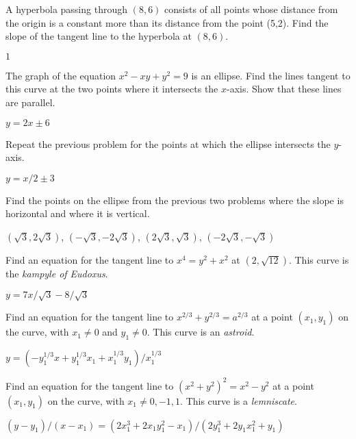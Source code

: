 \begin{exercises}
\begin{exercise}
A hyperbola passing through $(8,6)$ consists of all points whose distance
from the origin is a constant more than its distance from the point (5,2).
Find the slope of the tangent line to the hyperbola at $(8,6)$.
\begin{answer} $1$
\end{answer}\end{exercise}

\begin{exercise} The graph of the equation $x^2 - xy + y^2 = 9$ is an ellipse.
Find the lines tangent to this curve at the two
 points where it intersects the $x$-axis. Show that these lines are
 parallel.
\begin{answer} $y=2x\pm6$
\end{answer}\end{exercise}

\begin{exercise} Repeat the previous problem for the points at which the
 ellipse intersects the $y$-axis.
\begin{answer} $y=x/2\pm3$
\end{answer}\end{exercise}

\begin{exercise} Find the points on the ellipse from the previous two problems
 where the slope is horizontal and where it is vertical.
\begin{answer} $(\sqrt3,2\sqrt3)$, $(-\sqrt3,-2\sqrt3)$, $(2\sqrt3,\sqrt3)$,
$(-2\sqrt3,-\sqrt3)$ 
\end{answer}\end{exercise}

\begin{exercise} Find an equation for the tangent line to 
$x^4 = y^2 + x^2$ at $(2, \sqrt{12})$. 
This curve is the \textit{kampyle of Eudoxus}.
\begin{answer} $y=7x/\sqrt3-8/\sqrt3$
\end{answer}\end{exercise}

\begin{exercise} Find an equation for the tangent line to $x^{2/3} +
y^{2/3} = a^{2/3}$ at a point $(x_1 ,y_1)$ on the curve, 
with $x_1 \neq 0$ and $y_1 \neq 0$. This curve is an \textit{astroid}.
\begin{answer} $y=(-y_1^{1/3}x+y_1^{1/3}x_1+x_1^{1/3}y_1)/x_1^{1/3}$
\end{answer}\end{exercise}

\begin{exercise} Find an equation for the tangent line to $(x^2 +y^2 )^2 =x^2
-y^2$ at a point $(x_1 , y_1)$ on the curve, with $x_1 \neq 0, -1, 1$.
This curve is a \textit{lemniscate}.
\begin{answer} $(y-y_1)/(x-x_1)=(2x_1^3+2x_1y_1^2-x_1)/(2y_1^3+2y_1x_1^2+y_1)$
\end{answer}\end{exercise}


\end{exercises}
